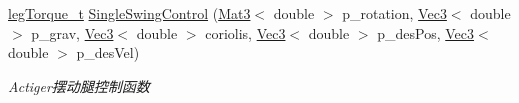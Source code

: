 \begin{DoxyCompactItemize}
\hyperlink{structlegTorque__t}{leg\+Torque\+\_\+t} \hyperlink{classquadruped_1_1SingleLeg_a222857a901318676d20d34581fd7504a}{Single\+Swing\+Control} (\hyperlink{cppTypes_8h_adb7d462b35d31f0b2583b3e230a2a2c3}{Mat3}$<$ double $>$ p\+\_\+rotation, \hyperlink{cppTypes_8h_a65c27bf97693676535dd0b30ea0ad399}{Vec3}$<$ double $>$ p\+\_\+grav, \hyperlink{cppTypes_8h_a65c27bf97693676535dd0b30ea0ad399}{Vec3}$<$ double $>$ coriolis, \hyperlink{cppTypes_8h_a65c27bf97693676535dd0b30ea0ad399}{Vec3}$<$ double $>$ p\+\_\+des\+Pos, \hyperlink{cppTypes_8h_a65c27bf97693676535dd0b30ea0ad399}{Vec3}$<$ double $>$ p\+\_\+des\+Vel)
\begin{DoxyCompactList}\small\item\em Actiger摆动腿控制函数 \end{DoxyCompactList}\end{DoxyCompactItemize}
